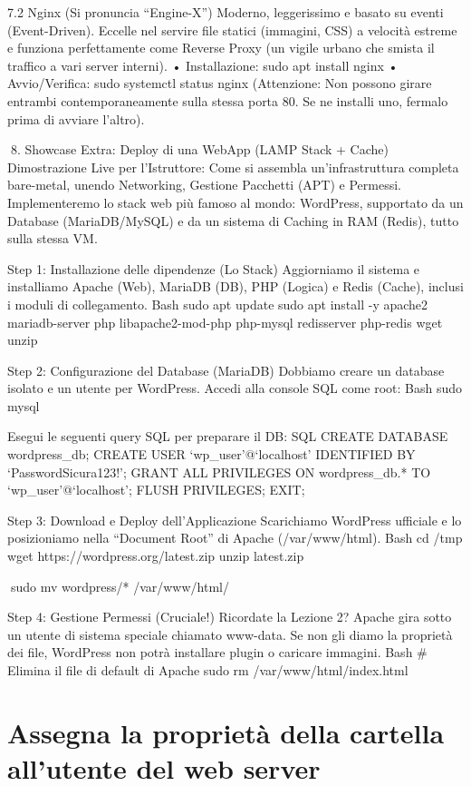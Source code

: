 \documentclass[11pt,a4paper]{article}
\begin{document}
7.2 Nginx (Si pronuncia ``Engine-X'') Moderno, leggerissimo e basato su
eventi (Event-Driven). Eccelle nel servire file statici (immagini, CSS)
a velocità estreme e funziona perfettamente come Reverse Proxy (un
vigile urbano che smista il traffico a vari server interni). •
Installazione: sudo apt install nginx • Avvio/Verifica: sudo systemctl
status nginx (Attenzione: Non possono girare entrambi contemporaneamente
sulla stessa porta 80. Se ne installi uno, fermalo prima di avviare
l'altro).

8. Showcase Extra: Deploy di una WebApp (LAMP Stack + Cache)
Dimostrazione Live per l'Istruttore: Come si assembla un'infrastruttura
completa bare-metal, unendo Networking, Gestione Pacchetti (APT) e
Permessi. Implementeremo lo stack web più famoso al mondo: WordPress,
supportato da un Database (MariaDB/MySQL) e da un sistema di Caching in
RAM (Redis), tutto sulla stessa VM.

Step 1: Installazione delle dipendenze (Lo Stack) Aggiorniamo il sistema
e installiamo Apache (Web), MariaDB (DB), PHP (Logica) e Redis (Cache),
inclusi i moduli di collegamento. Bash sudo apt update sudo apt install
-y apache2 mariadb-server php libapache2-mod-php php-mysql redisserver
php-redis wget unzip

Step 2: Configurazione del Database (MariaDB) Dobbiamo creare un
database isolato e un utente per WordPress. Accedi alla console SQL come
root: Bash sudo mysql

Esegui le seguenti query SQL per preparare il DB: SQL CREATE DATABASE
wordpress\_db; CREATE USER `wp\_user'@`localhost' IDENTIFIED BY
`PasswordSicura123!'; GRANT ALL PRIVILEGES ON wordpress\_db.* TO
`wp\_user'@`localhost'; FLUSH PRIVILEGES; EXIT;

Step 3: Download e Deploy dell'Applicazione Scarichiamo WordPress
ufficiale e lo posizioniamo nella ``Document Root'' di Apache
(/var/www/html). Bash cd /tmp wget https://wordpress.org/latest.zip
unzip latest.zip

sudo mv wordpress/* /var/www/html/

Step 4: Gestione Permessi (Cruciale!) Ricordate la Lezione 2? Apache
gira sotto un utente di sistema speciale chiamato www-data. Se non gli
diamo la proprietà dei file, WordPress non potrà installare plugin o
caricare immagini. Bash \# Elimina il file di default di Apache sudo rm
/var/www/html/index.html

\section{Assegna la proprietà della cartella all'utente del web
server}\label{assegna-la-proprietuxe0-della-cartella-allutente-del-web-server}
\end{document}
